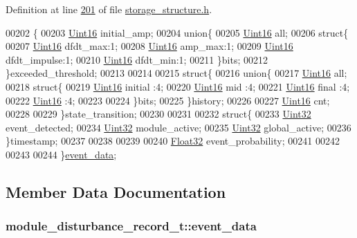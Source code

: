 Definition at line \hyperlink{a00003_source_l00201}{201} of file \hyperlink{a00003_source}{storage\+\_\+structure.\+h}.


\begin{DoxyCode}
00202    \{
00203      \hyperlink{a00001_aae7407b021d43f7193a81a58cfb3e297}{Uint16}                     initial\_amp;
00204     \textcolor{keyword}{union}\{
00205         \hyperlink{a00001_aae7407b021d43f7193a81a58cfb3e297}{Uint16} all;
00206         \textcolor{keyword}{struct}\{
00207             \hyperlink{a00001_aae7407b021d43f7193a81a58cfb3e297}{Uint16} dfdt\_max:1;
00208             \hyperlink{a00001_aae7407b021d43f7193a81a58cfb3e297}{Uint16} amp\_max:1;
00209             \hyperlink{a00001_aae7407b021d43f7193a81a58cfb3e297}{Uint16} dfdt\_impulse:1;
00210             \hyperlink{a00001_aae7407b021d43f7193a81a58cfb3e297}{Uint16} dfdt\_min:1;
00211         \}bits;
00212     \}exceeded\_threshold;
00213 
00214 
00215     \textcolor{keyword}{struct}\{
00216     \textcolor{keyword}{union}\{
00217         \hyperlink{a00001_aae7407b021d43f7193a81a58cfb3e297}{Uint16} all;
00218         \textcolor{keyword}{struct}\{
00219             \hyperlink{a00001_aae7407b021d43f7193a81a58cfb3e297}{Uint16} initial  :4;
00220             \hyperlink{a00001_aae7407b021d43f7193a81a58cfb3e297}{Uint16} mid      :4;
00221             \hyperlink{a00001_aae7407b021d43f7193a81a58cfb3e297}{Uint16} \textcolor{keyword}{final}    :4;
00222             \hyperlink{a00001_aae7407b021d43f7193a81a58cfb3e297}{Uint16}          :4;
00223 
00224         \}bits;
00225     \}history;
00226 
00227     \hyperlink{a00001_aae7407b021d43f7193a81a58cfb3e297}{Uint16} cnt;
00228 
00229     \}state\_transition;
00230 
00231 
00232     \textcolor{keyword}{struct}\{
00233      \hyperlink{a00001_ab56a7153a5b218eac7698ff141009735}{Uint32}                    event\_detected;
00234      \hyperlink{a00001_ab56a7153a5b218eac7698ff141009735}{Uint32}                    module\_active;
00235      \hyperlink{a00001_ab56a7153a5b218eac7698ff141009735}{Uint32}                    global\_active;
00236     \}timestamp;
00237 
00238 
00239 
00240     \hyperlink{a00001_a87d38f886e617ced2698fc55afa07637}{Float32}                    event\_probability;
00241 
00242 
00243 
00244     \}\hyperlink{a00008_a5a700ec4c240f4e86c5fb61aef8d983e}{event\_data};
\end{DoxyCode}


\subsection{Member Data Documentation}
\hypertarget{a00008_a5a700ec4c240f4e86c5fb61aef8d983e}{
\subsubsection[{event\+\_\+data}]{\setlength{\rightskip}{0pt plus 5cm}module\+\_\+disturbance\+\_\+record\+\_\+t\+::event\+\_\+data}}\label{a00008_a5a700ec4c240f4e86c5fb61aef8d983e}


